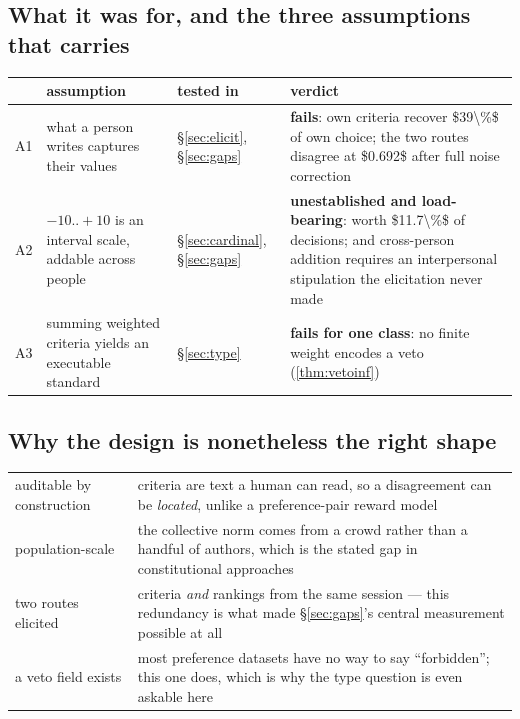 \subsection{What it was for, and the three assumptions that carries}


\begin{table}[H]\centering\small
\begin{tabularx}{\textwidth}{P{1.0cm}P{4.6cm}P{3.4cm}Y}
\toprule
& assumption & tested in & verdict\\
\midrule
A1 & what a person writes captures their values & §\ref{sec:elicit},
§\ref{sec:gaps} & \textbf{fails}: own criteria recover \num{$39\%$} of own
choice; the two routes disagree at \num{$0.692$} after full noise correction\\
A2 & $-10..{+}10$ is an interval scale, addable across people &
§\ref{sec:cardinal}, §\ref{sec:gaps} & \textbf{unestablished and load-bearing}:
worth \num{$11.7\%$} of decisions; and cross-person addition requires an
interpersonal stipulation the elicitation never made\\
A3 & summing weighted criteria yields an executable standard & §\ref{sec:type} &
\textbf{fails for one class}: no finite weight encodes a veto
(\cref{thm:vetoinf})\\
\bottomrule
\end{tabularx}
\end{table}

\subsection{Why the design is nonetheless the right shape}


\begin{table}[H]\centering\small
\begin{tabularx}{\textwidth}{P{3.2cm}Y}
\toprule
auditable by construction & criteria are text a human can read, so a disagreement
can be \emph{located}, unlike a preference-pair reward model\\
population-scale & the collective norm comes from a crowd rather than a handful of
authors, which is the stated gap in constitutional approaches\\
two routes elicited & criteria \emph{and} rankings from the same session --- this
redundancy is what made §\ref{sec:gaps}'s central measurement possible at all\\
a veto field exists & most preference datasets have no way to say ``forbidden'';
this one does, which is why the type question is even askable here\\
\bottomrule
\end{tabularx}
\end{table}

